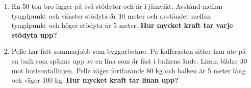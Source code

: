 \documentclass[11pt]{article}
\begin{document}
\begin{enumerate}[itemsep=2em]
        \newpage
        \item
              En 50 ton bro ligger på två stödytor och är i jämvikt.  Avstånd mellan tyngdpunkt och vänster stödyta är 10 meter och avståndet mellan tyngdpunkt och höger stödyta är 5 meter.
              \textbf{Hur mycket kraft tar varje stödyta upp?}
              \begin{center}
                      
              \end{center}

        \item
              Pelle har fått sommarjobb som byggarbetare. På kafferasten sitter han ute på en balk som spänns upp av en lina som är fäst i balkens ände. Linan bildar 30\degree{} mot horisontallinjen. Pelle väger fortfarande 80 kg och balken är 5 meter lång och väger 100 kg. \textbf{Hur mycket kraft tar linan upp?}
              \begin{center}
                      
              \end{center}

\end{enumerate}
\end{document}
